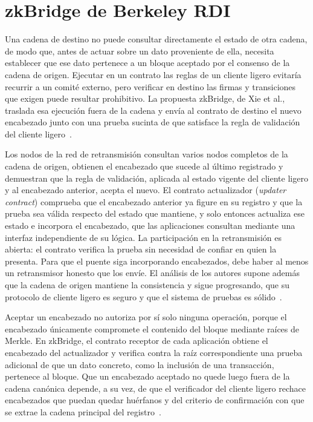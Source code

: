 \section{zkBridge de Berkeley RDI}
\label{sec:zkbridge_berkeley}

Una cadena de destino no puede consultar directamente el estado de otra cadena, de modo que, antes
de actuar sobre un dato proveniente de ella, necesita establecer que ese dato pertenece a un bloque
aceptado por el consenso de la cadena de origen. Ejecutar en un contrato las reglas de un cliente
ligero evitaría recurrir a un comité externo, pero verificar en destino las firmas y transiciones
que exigen puede resultar prohibitivo. La propuesta zkBridge, de Xie et
al., traslada esa ejecución fuera de la cadena y envía al contrato de destino el nuevo encabezado
junto con una prueba sucinta de que satisface la regla de validación del cliente
ligero~\cite{xie2022zkbridge}.

Los nodos de la red de retransmisión consultan varios nodos completos de la cadena de origen,
obtienen el encabezado que sucede al último registrado y demuestran que la regla de validación,
aplicada al estado vigente del cliente ligero y al encabezado anterior, acepta el nuevo. El contrato
actualizador (\textit{updater contract}) comprueba que el encabezado anterior ya figure en su
registro y que la prueba sea válida respecto del estado que mantiene, y solo entonces actualiza ese
estado e incorpora el encabezado, que las aplicaciones consultan mediante una interfaz independiente
de su lógica. La participación en la retransmisión es abierta: el contrato verifica la prueba sin
necesidad de confiar en quien la presenta. Para que el puente siga incorporando encabezados, debe
haber al menos un retransmisor honesto que los envíe. El análisis de los autores supone además que
la cadena de origen mantiene la consistencia y sigue progresando, que su protocolo de cliente ligero
es seguro y que el sistema de pruebas es sólido~\cite{xie2022zkbridge}.

Aceptar un encabezado no autoriza por sí solo ninguna operación, porque el encabezado únicamente
compromete el contenido del bloque mediante raíces de Merkle. En zkBridge, el contrato receptor de
cada aplicación obtiene el encabezado del actualizador y verifica contra la raíz correspondiente una
prueba adicional de que un dato concreto, como la
inclusión de una transacción, pertenece al bloque. Que un encabezado aceptado no quede luego fuera
de la cadena canónica depende, a su vez, de que el verificador del cliente ligero rechace
encabezados que puedan quedar huérfanos y del criterio de confirmación con que se extrae la cadena
principal del registro~\cite{xie2022zkbridge}.

